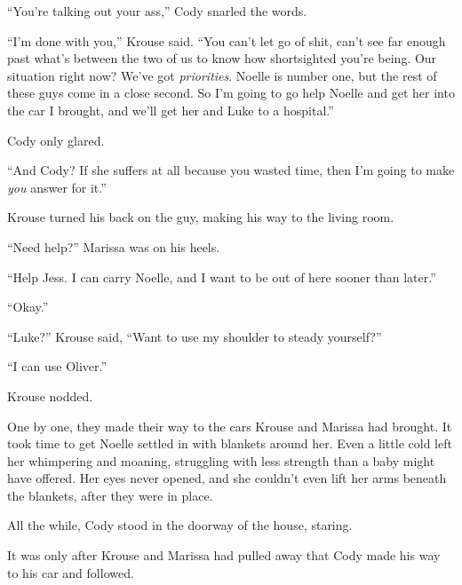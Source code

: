 ``You're talking out your ass,'' Cody snarled the words.



``I'm done with you,'' Krouse said.  ``You can't let go of shit, can't see far enough past what's between the two of us to know how shortsighted you're being.  Our situation right now?  We've got \emph{priorities}.  Noelle is number one, but the rest of these guys come in a close second.  So I'm going to go help Noelle and get her into the car I brought, and we'll get her and Luke to a hospital.''



Cody only glared.



``And Cody?  If she suffers at all because you wasted time, then I'm going to make \emph{you} answer for it.''



Krouse turned his back on the guy, making his way to the living room.



``Need help?''  Marissa was on his heels.



``Help Jess.  I can carry Noelle, and I want to be out of here sooner than later.''



``Okay.''



``Luke?'' Krouse said, ``Want to use my shoulder to steady yourself?''



``I can use Oliver.''



Krouse nodded.



One by one, they made their way to the cars Krouse and Marissa had brought.  It took time to get Noelle settled in with blankets around her.  Even a little cold left her whimpering and moaning, struggling with less strength than a baby might have offered.  Her eyes never opened, and she couldn't even lift her arms beneath the blankets, after they were in place.



All the while, Cody stood in the doorway of the house, staring.



It was only after Krouse and Marissa had pulled away that Cody made his way to his car and followed.



\blacksquare



